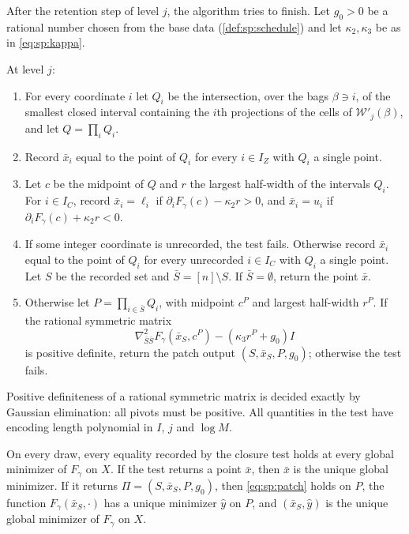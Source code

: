After the retention step of level $j$, the algorithm tries to finish. Let
$g_0>0$ be a rational number chosen from the base data (\cref{def:sp:schedule})
and let $\kappa_2,\kappa_3$ be as in \eqref{eq:sp:kappa}.

\begin{definition}\label{def:sp:closure}
At level $j$:
\begin{enumerate}[label=(\arabic*)]
\item For every coordinate $i$ let $Q_i$ be the intersection, over the bags
$\beta\ni i$, of the smallest closed interval containing the $i$th
projections of the cells of $\mathcal W'_j(\beta)$, and let
$Q=\prod_iQ_i$.
\item Record $\bar x_i$ equal to the point of $Q_i$ for every $i\in I_Z$ with
$Q_i$ a single point.
\item Let $c$ be the midpoint of $Q$ and $r$ the largest half-width of the
intervals $Q_i$. For $i\in I_C$, record $\bar x_i=\ell_i$ if
$\partial_iF_\gamma(c)-\kappa_2r>0$, and $\bar x_i=u_i$ if
$\partial_iF_\gamma(c)+\kappa_2r<0$.
\item If some integer coordinate is unrecorded, the test fails. Otherwise
record $\bar x_i$ equal to the point of $Q_i$ for every unrecorded $i\in I_C$
with $Q_i$ a single point. Let $S$ be the recorded set and $\bar S=[n]\setminus S$.
If $\bar S=\emptyset$, return the point $\bar x$.
\item Otherwise let $P=\prod_{i\in\bar S}Q_i$, with midpoint $c^P$ and
largest half-width $r^P$. If the rational symmetric matrix
\begin{equation}\label{eq:sp:matrix}
 \nabla^2_{\bar S\bar S}F_\gamma(\bar x_S,c^P)-(\kappa_3r^P+g_0)I
\end{equation}
is positive definite, return the patch output $(S,\bar x_S,P,g_0)$;
otherwise the test fails.
\end{enumerate}
\end{definition}

Positive definiteness of a rational symmetric matrix is decided exactly by
Gaussian elimination: all pivots must be positive. All quantities in the test
have encoding length polynomial in $I$, $j$ and $\log M$.

\begin{proposition}\label{prop:sp:closure-sound}
On every draw, every equality recorded by the closure test holds at every
global minimizer of $F_\gamma$ on $X$. If the test returns a point $\bar x$,
then $\bar x$ is the unique global minimizer. If it returns
$\Pi=(S,\bar x_S,P,g_0)$, then \eqref{eq:sp:patch} holds on $P$, the function
$F_\gamma(\bar x_S,\cdot)$ has a unique minimizer $\hat y$ on $P$, and
$(\bar x_S,\hat y)$ is the unique global minimizer of $F_\gamma$ on $X$.
\end{proposition}

